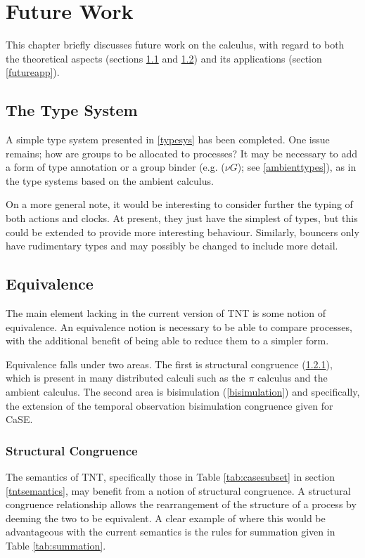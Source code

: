 \chapter{Future Work}
\label{futurework}

This chapter briefly discusses future work on the calculus, with regard
to both the theoretical aspects (sections \ref{futuretypes} and
\ref{futureequiv}) and its applications (section \ref{futureapp}).

\section{The Type System}
\label{futuretypes}

A simple type system presented in \ref{typesys} has been completed.
One issue remains; how are groups to be allocated to processes?  It may be
necessary to add a form of type annotation or a group binder (e.g. ($\nu
G$); see \ref{ambienttypes}), as in the type systems based on the
ambient calculus.

On a more general note, it would be interesting to consider further the
typing of both actions and clocks.  At present, they just have the
simplest of types, but this could be extended to provide more
interesting behaviour.  Similarly, bouncers only have rudimentary types
and may possibly be changed to include more detail.

\section{Equivalence}
\label{futureequiv}

The main element lacking in the current version of TNT is some notion of
equivalence.  An equivalence notion is necessary to be able to compare
processes, with the additional benefit of being able to reduce them to a
simpler form.

Equivalence falls under two areas.  The first is structural congruence
(\ref{structcong}), which is present in many distributed calculi such as
the $\pi$ calculus and the ambient calculus.  The second area is
bisimulation (\ref{bisimulation}) and specifically, the extension of the
temporal observation bisimulation congruence given for CaSE.

\subsection{Structural Congruence}
\label{structcong}

The semantics of TNT, specifically those in Table \ref{tab:casesubset}
in section \ref{tntsemantics}, may benefit from a notion of structural
congruence.  A structural congruence relationship allows the
rearrangement of the structure of a process by deeming the two to be
equivalent.  A clear example of where this would be advantageous with
the current semantics is the rules for summation given in Table
\ref{tab:summation}.  

